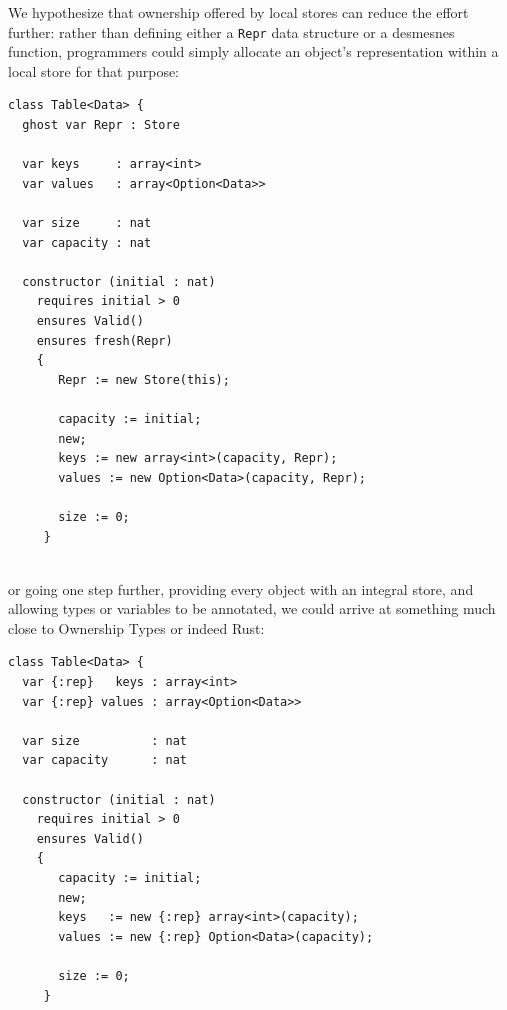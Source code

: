 We hypothesize that ownership offered by local stores can reduce the
effort further: rather than defining either a \lstinline+Repr+ data
structure or a desmesnes function, programmers could simply allocate
an object's representation within a local store for that purpose:

\begin{lstlisting}
class Table<Data> {
  ghost var Repr : Store

  var keys     : array<int>
  var values   : array<Option<Data>>

  var size     : nat
  var capacity : nat
    
  constructor (initial : nat)
    requires initial > 0
    ensures Valid()
    ensures fresh(Repr)
    {  
       Repr := new Store(this);
      
       capacity := initial;
       new;
       keys := new array<int>(capacity, Repr);
       values := new Option<Data>(capacity, Repr);

       size := 0;
     }
 
\end{lstlisting}

\noindent or going one step further, providing every object with an integral store,
and allowing types or variables to be annotated, we could arrive at
something much close to Ownership Types \cite{noble_flexible_1998} or
indeed Rust:

\begin{lstlisting}
class Table<Data> {
  var {:rep}   keys : array<int>
  var {:rep} values : array<Option<Data>>

  var size          : nat
  var capacity      : nat
    
  constructor (initial : nat)
    requires initial > 0
    ensures Valid()
    {  
       capacity := initial;
       new;
       keys   := new {:rep} array<int>(capacity);
       values := new {:rep} Option<Data>(capacity);

       size := 0;
     }
 
\end{lstlisting}








